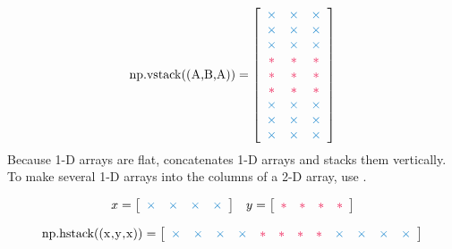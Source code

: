 \begin{align*}
\text{\li{np.vstack((A,B,A))}} =
\left[\begin{array}{ccc}
\textcolor{blue}{\times}&\textcolor{blue}{\times}&\textcolor{blue}{\times}\\
\textcolor{blue}{\times}&\textcolor{blue}{\times}&\textcolor{blue}{\times}\\
\textcolor{blue}{\times}&\textcolor{blue}{\times}&\textcolor{blue}{\times}\\
\textcolor{red}{*} & \textcolor{red}{*} & \textcolor{red}{*} \\
\textcolor{red}{*} & \textcolor{red}{*} & \textcolor{red}{*} \\
\textcolor{red}{*} & \textcolor{red}{*} & \textcolor{red}{*} \\
\textcolor{blue}{\times}&\textcolor{blue}{\times}&\textcolor{blue}{\times}\\
\textcolor{blue}{\times}&\textcolor{blue}{\times}&\textcolor{blue}{\times}\\
\textcolor{blue}{\times}&\textcolor{blue}{\times}&\textcolor{blue}{\times}
\end{array}\right]
\end{align*}
Because 1-D arrays are flat,  concatenates 1-D arrays and  stacks them vertically.
To make several 1-D arrays into the columns of a 2-D array, use .

\begin{align*}
x = \left[\begin{array}{cccc}
\textcolor{blue}{\times}&\textcolor{blue}{\times}&\textcolor{blue}{\times}&\textcolor{blue}{\times}
\end{array}\right]
&&
y = \left[\begin{array}{cccc}
\textcolor{red}{*}&\textcolor{red}{*}&\textcolor{red}{*}&\textcolor{red}{*}\end{array}\right]
\end{align*}

\begin{align*}
\text{\li{np.hstack((x,y,x))}} =
\left[\begin{array}{cccccccccccc}
\textcolor{blue}{\times}&\textcolor{blue}{\times}&\textcolor{blue}{\times}&\textcolor{blue}{\times}&
\textcolor{red}{*}&\textcolor{red}{*}&\textcolor{red}{*}&\textcolor{red}{*}&
\textcolor{blue}{\times}&\textcolor{blue}{\times}&\textcolor{blue}{\times}&\textcolor{blue}{\times}
\end{array}\right]
\end{align*}

